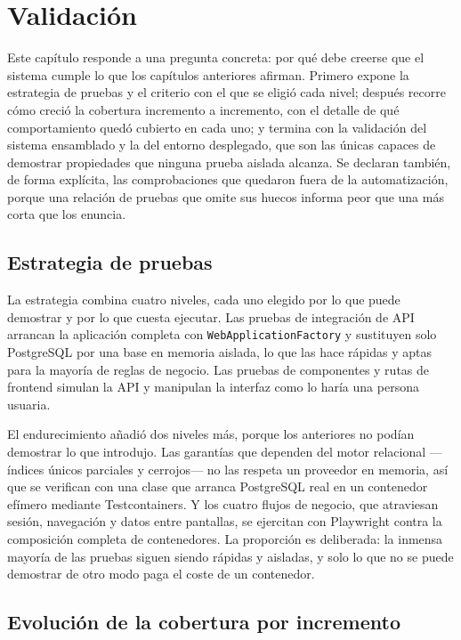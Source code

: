 \chapter{Validación}
\label{chap:validacion}

Este capítulo responde a una pregunta concreta: por qué debe creerse que el sistema cumple lo que los capítulos anteriores afirman. Primero expone la estrategia de pruebas y el criterio con el que se eligió cada nivel; después recorre cómo creció la cobertura incremento a incremento, con el detalle de qué comportamiento quedó cubierto en cada uno; y termina con la validación del sistema ensamblado y la del entorno desplegado, que son las únicas capaces de demostrar propiedades que ninguna prueba aislada alcanza. Se declaran también, de forma explícita, las comprobaciones que quedaron fuera de la automatización, porque una relación de pruebas que omite sus huecos informa peor que una más corta que los enuncia.

\section{Estrategia de pruebas}

La estrategia combina cuatro niveles, cada uno elegido por lo que puede demostrar y por lo que cuesta ejecutar. Las pruebas de integración de API arrancan la aplicación completa con \texttt{WebApplicationFactory} y sustituyen solo PostgreSQL por una base en memoria aislada, lo que las hace rápidas y aptas para la mayoría de reglas de negocio. Las pruebas de componentes y rutas de frontend simulan la API y manipulan la interfaz como lo haría una persona usuaria.

El endurecimiento añadió dos niveles más, porque los anteriores no podían demostrar lo que introdujo. Las garantías que dependen del motor relacional ---índices únicos parciales y cerrojos--- no las respeta un proveedor en memoria, así que se verifican con una clase que arranca PostgreSQL real en un contenedor efímero mediante Testcontainers. Y los cuatro flujos de negocio, que atraviesan sesión, navegación y datos entre pantallas, se ejercitan con Playwright contra la composición completa de contenedores. La proporción es deliberada: la inmensa mayoría de las pruebas siguen siendo rápidas y aisladas, y solo lo que no se puede demostrar de otro modo paga el coste de un contenedor.

\section{Evolución de la cobertura por incremento}


